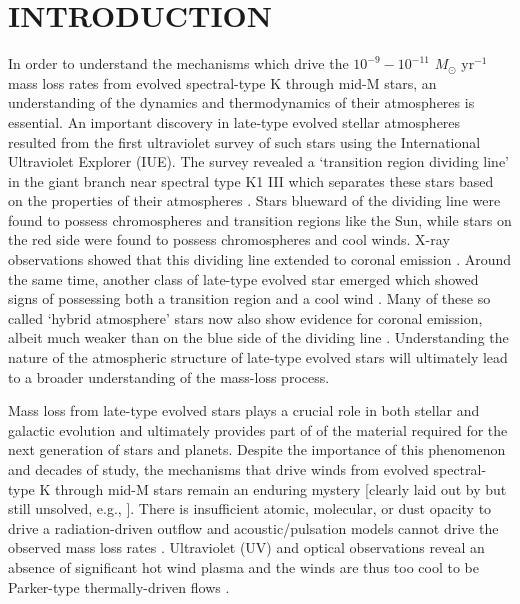 \documentclass[iop]{emulateapj}
\begin{document}

\section{INTRODUCTION}

In order to understand the mechanisms which drive the $10^{-9}-10^{-11}$ $M_{\odot}$ yr$^{-1}$ mass loss rates from evolved spectral-type K through mid-M stars, an understanding of the dynamics and thermodynamics of their atmospheres is essential. An important discovery in late-type evolved stellar atmospheres resulted from the first ultraviolet survey of such stars using the International Ultraviolet Explorer (IUE). The survey revealed a `transition region dividing line' in the giant branch near spectral type K1 III which separates these stars based on the properties of their atmospheres \citep{1979ApJ...229L..27L}. Stars blueward of the dividing line were found to possess chromospheres and transition regions like the Sun, while stars on the red side were found to possess chromospheres and cool winds. X-ray observations showed that this dividing line extended to coronal emission \citep{1981ApJ...250..293A}. Around the same time, another class of late-type evolved star emerged which showed signs of possessing both a transition region and a cool wind \citep[e.g.,][]{1982A&A...107..292R}. Many of these so called `hybrid atmosphere' stars now also show evidence for coronal emission, albeit much weaker than on the blue side of the dividing line \citep{1997ApJ...491..876A,2005ApJ...622..629D}. Understanding the nature of the atmospheric structure of late-type evolved stars will ultimately lead to a broader understanding of the mass-loss process.

Mass loss from late-type evolved stars plays a crucial role in both stellar and galactic evolution and ultimately provides part of of the material required for the next generation of stars and planets. Despite the importance of this phenomenon and decades of study, the mechanisms that drive winds from evolved spectral-type K through mid-M stars remain an enduring mystery [clearly laid out by \cite{1985ASSL..117..229H} but still unsolved, e.g., \cite{2009AIPC.1094..267C}]. There is insufficient atomic, molecular, or dust opacity to drive a radiation-driven outflow \citep{1995ApJ...446L..79Z,2008MNRAS.387..845J} and acoustic/pulsation models cannot drive the observed mass loss rates \citep{1995ApJ...442L..61S}. Ultraviolet (UV) and optical observations reveal an absence of significant hot wind plasma and the winds are thus too cool to be Parker-type thermally-driven flows \cite[e.g.,][]{1979ApJ...229L..27L,1980ApJ...235..519H,1981ApJ...250..293A}. 
\end{document}
